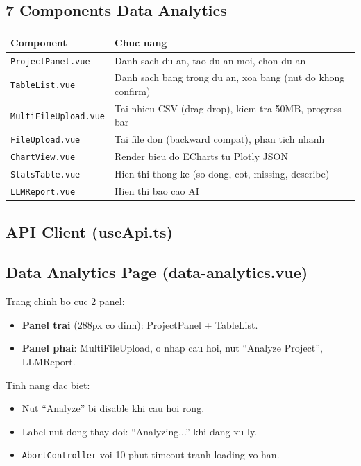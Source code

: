 \documentclass[12pt,a4paper]{article}
\begin{document}
\subsection{7 Components Data Analytics}

\begin{tabularx}{\textwidth}{lX}
\toprule
\bfseries Component & \bfseries Chuc nang \\
\midrule
\texttt{ProjectPanel.vue}
& Danh sach du an, tao du an moi, chon du an \\
\texttt{TableList.vue}
& Danh sach bang trong du an, xoa bang (nut do khong confirm) \\
\texttt{MultiFileUpload.vue}
& Tai nhieu CSV (drag-drop), kiem tra 50MB, progress bar \\
\texttt{FileUpload.vue}
& Tai file don (backward compat), phan tich nhanh \\
\texttt{ChartView.vue}
& Render bieu do ECharts tu Plotly JSON \\
\texttt{StatsTable.vue}
& Hien thi thong ke (so dong, cot, missing, describe) \\
\texttt{LLMReport.vue}
& Hien thi bao cao AI \\
\bottomrule
\end{tabularx}

\subsection{API Client (useApi.ts)}



\subsection{Data Analytics Page (data-analytics.vue)}

Trang chinh bo cuc 2 panel:
\begin{itemize}
  \item \textbf{Panel trai} (288px co dinh): ProjectPanel + TableList.
  \item \textbf{Panel phai}: MultiFileUpload, o nhap cau hoi, nut
        ``Analyze Project'', LLMReport.
\end{itemize}

Tinh nang dac biet:
\begin{itemize}
  \item Nut ``Analyze'' bi disable khi cau hoi rong.
  \item Label nut dong thay doi: ``Analyzing...'' khi dang xu ly.
  \item \texttt{AbortController} voi 10-phut timeout tranh loading vo han.
\end{itemize}
\end{document}
